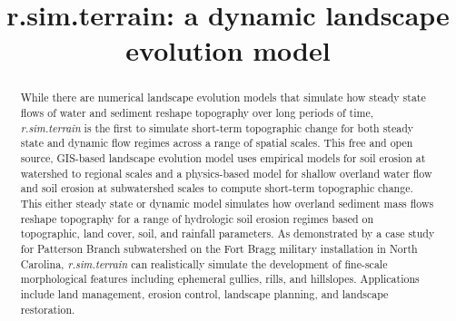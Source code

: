 \documentclass[esurf, manuscript]{copernicus}
\begin{document}
\title{\lowercase{r.sim.terrain}: a dynamic landscape evolution model} 






\received{}
\pubdiscuss{} %
\revised{}
\accepted{}
\published{}


\maketitle

\begin{abstract}
While there are numerical landscape evolution models
that simulate how steady state flows of water and sediment
reshape topography over long periods of time, 
\emph{r.sim.terrain} is the first to 
simulate short-term topographic change 
for both steady state and dynamic flow regimes
across a range of spatial scales.
This free and open source, 
GIS-based landscape evolution model
uses empirical models for soil erosion
at watershed to regional scales 
and a physics-based model
for shallow overland water flow and soil erosion 
at subwatershed scales
to compute short-term topographic change. 
This either steady state or dynamic model simulates
how overland sediment mass flows reshape topography
for a range of hydrologic soil erosion regimes
based on topographic, land cover, soil, and rainfall parameters. 
As demonstrated by a case study 
for Patterson Branch subwatershed
on the Fort Bragg military installation in North Carolina,
\emph{r.sim.terrain} can realistically simulate the development of 
fine-scale morphological features including 
ephemeral gullies, rills, and hillslopes.
Applications include land management, erosion control,
landscape planning, and landscape restoration. 
\end{abstract}
\end{document}
